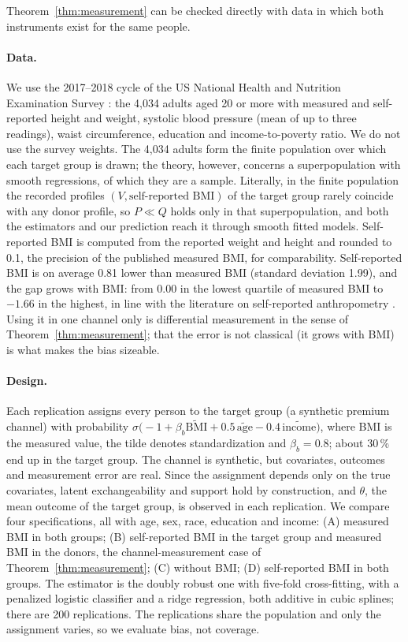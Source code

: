\documentclass[twoside,11pt]{article}
\theoremstyle{plain}
\theoremstyle{definition}
\begin{document}
Theorem~\ref{thm:measurement} can be checked directly with data in which both instruments exist for the same people.

\paragraph{Data.} We use the 2017--2018 cycle of the US National Health and Nutrition Examination Survey \citep{nchs2020}: the 4{,}034 adults aged 20 or more with measured and self-reported height and weight, systolic blood pressure (mean of up to three readings), waist circumference, education and income-to-poverty ratio. We do not use the survey weights. The 4{,}034 adults form the finite population over which each target group is drawn; the theory, however, concerns a superpopulation with smooth regressions, of which they are a sample. Literally, in the finite population the recorded profiles $(V,\text{self-reported BMI})$ of the target group rarely coincide with any donor profile, so $P\ll Q$ holds only in that superpopulation, and both the estimators and our prediction reach it through smooth fitted models. Self-reported BMI is computed from the reported weight and height and rounded to 0.1, the precision of the published measured BMI, for comparability. Self-reported BMI is on average 0.81 lower than measured BMI (standard deviation 1.99), and the gap grows with BMI: from 0.00 in the lowest quartile of measured BMI to $-1.66$ in the highest, in line with the literature on self-reported anthropometry \citep{connorgorber2007}. Using it in one channel only is differential measurement in the sense of Theorem~\ref{thm:measurement}; that the error is not classical (it grows with BMI) is what makes the bias sizeable.

\paragraph{Design.} Each replication assigns every person to the target group (a synthetic premium channel) with probability $\sigma\bigl(-1+\beta_b \tilde{\mathrm{BMI}}+0.5\,\tilde{\mathrm{age}}-0.4\,\tilde{\mathrm{income}}\bigr)$, where BMI is the measured value, the tilde denotes standardization and $\beta_b=0.8$; about 30\,\% end up in the target group. The channel is synthetic, but covariates, outcomes and measurement error are real. Since the assignment depends only on the true covariates, latent exchangeability and support hold by construction, and $\theta$, the mean outcome of the target group, is observed in each replication. We compare four specifications, all with age, sex, race, education and income: (A) measured BMI in both groups; (B) self-reported BMI in the target group and measured BMI in the donors, the channel-measurement case of Theorem~\ref{thm:measurement}; (C) without BMI; (D) self-reported BMI in both groups. The estimator is the doubly robust one with five-fold cross-fitting, with a penalized logistic classifier and a ridge regression, both additive in cubic splines; there are 200 replications. The replications share the population and only the assignment varies, so we evaluate bias, not coverage.
\end{document}
